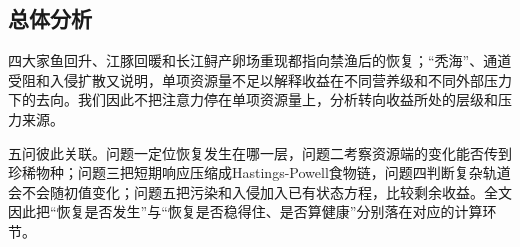 \subsection{总体分析}
四大家鱼回升、江豚回暖和长江鲟产卵场重现都指向禁渔后的恢复；“秃海”、通道受阻和入侵扩散又说明，单项资源量不足以解释收益在不同营养级和不同外部压力下的去向。我们因此不把注意力停在单项资源量上，分析转向收益所处的层级和压力来源。

五问彼此关联。问题一定位恢复发生在哪一层，问题二考察资源端的变化能否传到珍稀物种；问题三把短期响应压缩成Hastings-Powell食物链，问题四判断复杂轨道会不会随初值变化；问题五把污染和入侵加入已有状态方程，比较剩余收益。全文因此把“恢复是否发生”与“恢复是否稳得住、是否算健康”分别落在对应的计算环节。

